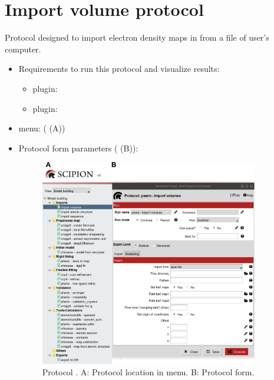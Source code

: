\section{Import volume protocol}
\label{app:importVolume}%
Protocol designed to import electron density maps in \scipion from a file of user's computer.
   
 \begin{itemize}
  \item Requirements to run this protocol and visualize results:
    \begin{itemize}
        \item \scipion plugin: 
        \item \scipion plugin: 
    \end{itemize}
  \item \scipion menu:
   ( (A))
  
  \item Protocol form parameters ( (B)):
  
  \begin{figure}[H]
    \centering 
    \captionsetup{width=.9\linewidth} 
    \includegraphics[width=0.90\textwidth]{Images_appendix/Fig100.pdf}
    \caption{Protocol . A: Protocol location in \scipion menu. B: Protocol form.}
    \label{fig:app_protocol_volume_1}
   \end{figure}
  


\end{itemize}
